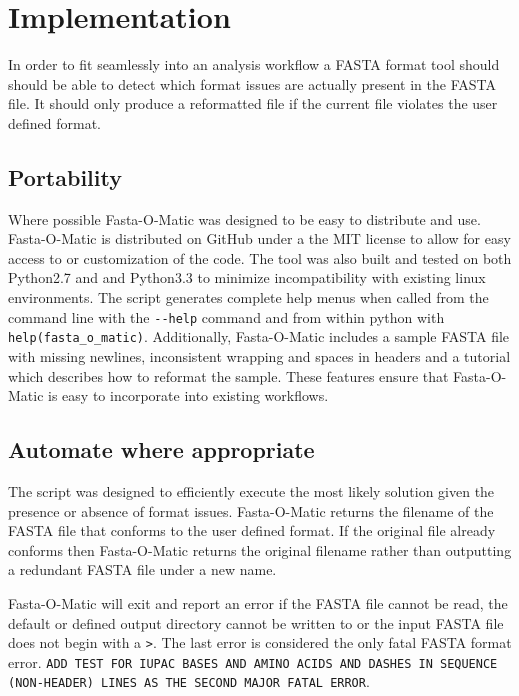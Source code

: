 \section{Implementation}

In order to fit seamlessly into an analysis workflow a FASTA format tool should should be able to detect which format issues are actually present in the FASTA file. It should only produce a reformatted file if the current file violates the user defined format. 


\subsection{Portability}

Where possible Fasta-O-Matic was designed to be easy to distribute and use. Fasta-O-Matic is distributed on GitHub under a the MIT license to allow for easy access to or customization of the code. The tool was also built and tested on both Python2.7 and and Python3.3 to minimize incompatibility with existing linux environments. The script generates complete help menus when called from the command line with the \verb|--help| command and from within python with \verb|help(fasta_o_matic)|. Additionally, Fasta-O-Matic includes a sample FASTA file with missing newlines, inconsistent wrapping and spaces in headers and a tutorial which describes how to reformat the sample. These features ensure that Fasta-O-Matic is easy to incorporate into existing workflows.

\subsection{Automate where appropriate} 

The script was designed to efficiently execute the most likely solution given the presence or absence of format issues. Fasta-O-Matic returns the filename of the FASTA file that conforms to the user defined format. If the original file already conforms then Fasta-O-Matic returns the original filename rather than outputting a redundant FASTA file under a new name.

Fasta-O-Matic will exit and report an error if the FASTA file cannot be read, the default or defined output directory cannot be written to or the input FASTA file does not begin with a \verb|>|. The last error is considered the only fatal FASTA format error. \verb|ADD TEST FOR IUPAC BASES AND AMINO ACIDS AND DASHES IN SEQUENCE (NON-HEADER) LINES AS THE SECOND MAJOR FATAL ERROR|.

